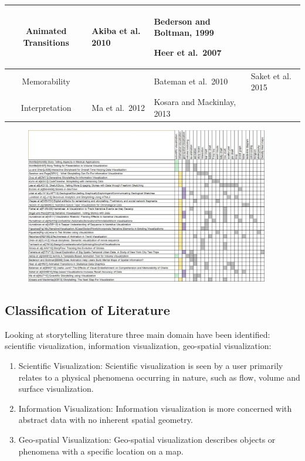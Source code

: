 \documentclass{egpubl}
\begin{document}
\begin{table}[htbp]
\begin{tabular}{c|| p{4cm}| p{5cm}|p{4cm}}
\hline
Animated Transitions & Akiba et al.\, 2010\cite{Akiba} \par & Bederson and Boltman, 1999\cite{bedrson}\par Heer et al.\, 2007 \cite{heer2007} \par &\\
\hline
Memorability & &  Bateman et al.\, 2010\cite{bateman} \par & Saket et al.\, 2015 \cite{saket2015} \par\\ 
\hline
Interpretation &  Ma et al.\, 2012\cite{sci} \par  &  Kosara and Mackinlay, 2013\cite{Kosara} \par & \\
\end{tabular}
\label{table:classification1} 
\end{table}

\begin{figure}
\includegraphics[width=0.95\textwidth]{./images/table2}
\label{table}
\end{figure}

\subsection{Classification of Literature}
Looking at storytelling literature three main domain have been identified: scientific visualization, information visualization, geo-spatial visualization\cite{spence2007}:
\begin{enumerate}
	\item Scientific Visualization: Scientific visualization is seen by a user primarily relates to a physical phenomena occurring in nature, such as flow, volume and surface visualization. 
	\item Information Visualization: Information visualization is more concerned with abstract data with no inherent spatial geometry.
	\item Geo-spatial Visualization: Geo-spatial visualization describes objects or phenomena with a specific location on a map.
\end{enumerate}
\end{document}
